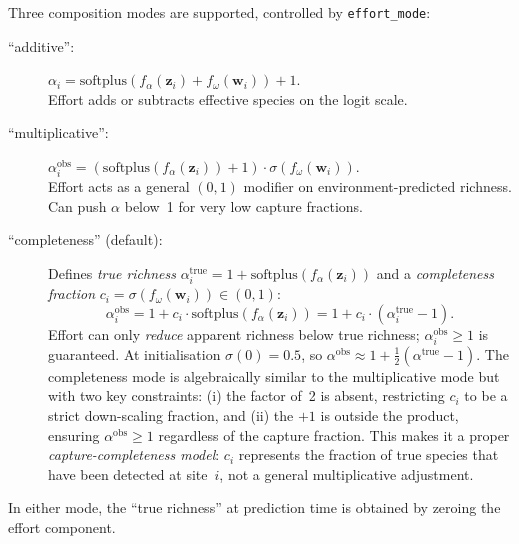 \documentclass{article}
\begin{document}
Three composition modes are supported, controlled by \texttt{effort\_mode}:
\begin{description}
    \item[``additive'':] $\alpha_i = \text{softplus}(f_\alpha(\mathbf{z}_i) + f_\omega(\mathbf{w}_i)) + 1$.\\  Effort adds or subtracts effective species on the logit scale.
    \item[``multiplicative'':] $\alpha_i^{\text{obs}} = (\text{softplus}(f_\alpha(\mathbf{z}_i)) + 1) \cdot \sigma(f_\omega(\mathbf{w}_i))$.\\  Effort acts as a general $(0,1)$ modifier on environment-predicted richness. Can push $\alpha$ below~1 for very low capture fractions.
    \item[``completeness'' (default):] Defines \emph{true richness} $\alpha_i^{\text{true}} = 1 + \text{softplus}(f_\alpha(\mathbf{z}_i))$ and a \emph{completeness fraction} $c_i = \sigma(f_\omega(\mathbf{w}_i)) \in (0,1)$:
    \begin{equation}
        \alpha_i^{\text{obs}} = 1 + c_i \cdot \text{softplus}(f_\alpha(\mathbf{z}_i)) = 1 + c_i \cdot (\alpha_i^{\text{true}} - 1).
    \end{equation}
    Effort can only \emph{reduce} apparent richness below true richness; $\alpha_i^{\text{obs}} \geq 1$ is guaranteed. At initialisation $\sigma(0) = 0.5$, so $\alpha^{\text{obs}} \approx 1 + \tfrac{1}{2}(\alpha^{\text{true}} - 1)$. The completeness mode is algebraically similar to the multiplicative mode but with two key constraints: (i) the factor of~2 is absent, restricting $c_i$ to be a strict down-scaling fraction, and (ii) the $+1$ is outside the product, ensuring $\alpha^{\text{obs}} \geq 1$ regardless of the capture fraction. This makes it a proper \emph{capture-completeness model}: $c_i$ represents the fraction of true species that have been detected at site~$i$, not a general multiplicative adjustment.
\end{description}
In either mode, the ``true richness'' at prediction time is obtained by zeroing the effort component.
\end{document}
